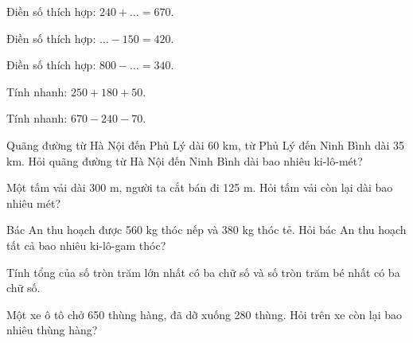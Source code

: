 \begin{ex}
Điền số thích hợp: $240 + \dots = 670$.
\end{ex}

\begin{ex}
Điền số thích hợp: $\dots - 150 = 420$.
\end{ex}

\begin{ex}
Điền số thích hợp: $800 - \dots = 340$.
\end{ex}

\begin{ex}
Tính nhanh: $250 + 180 + 50$.
\end{ex}

\begin{ex}
Tính nhanh: $670 - 240 - 70$.
\end{ex}

\begin{ex}
Quãng đường từ Hà Nội đến Phủ Lý dài 60 km, từ Phủ Lý đến Ninh Bình dài 35 km. Hỏi quãng đường từ Hà Nội đến Ninh Bình dài bao nhiêu ki-lô-mét?
\end{ex}

\begin{ex}
Một tấm vải dài 300 m, người ta cắt bán đi 125 m. Hỏi tấm vải còn lại dài bao nhiêu mét?
\end{ex}

\begin{ex}
Bác An thu hoạch được 560 kg thóc nếp và 380 kg thóc tẻ. Hỏi bác An thu hoạch tất cả bao nhiêu ki-lô-gam thóc?
\end{ex}

\begin{ex}
Tính tổng của số tròn trăm lớn nhất có ba chữ số và số tròn trăm bé nhất có ba chữ số.
\end{ex}

\begin{ex}
Một xe ô tô chở 650 thùng hàng, đã dỡ xuống 280 thùng. Hỏi trên xe còn lại bao nhiêu thùng hàng?
\end{ex}

